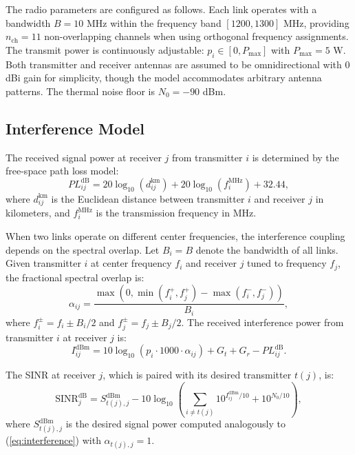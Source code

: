 \documentclass[conference]{IEEEtran}
\begin{document}
The radio parameters are configured as follows. Each link operates with a bandwidth $B = 10$ MHz within the frequency band $[1200, 1300]$ MHz, providing $n_{\text{ch}} = 11$ non-overlapping channels when using orthogonal frequency assignments. The transmit power is continuously adjustable: $p_i \in [0, P_{\max}]$ with $P_{\max} = 5$ W. Both transmitter and receiver antennas are assumed to be omnidirectional with 0 dBi gain for simplicity, though the model accommodates arbitrary antenna patterns. The thermal noise floor is $N_0 = -90$ dBm.

\subsection{Interference Model}

The received signal power at receiver $j$ from transmitter $i$ is determined by the free-space path loss model:
\begin{equation}
PL_{ij}^{\text{dB}} = 20\log_{10}(d_{ij}^{\text{km}}) + 20\log_{10}(f_{i}^{\text{MHz}}) + 32.44,
\label{eq:fspl}
\end{equation}
where $d_{ij}^{\text{km}}$ is the Euclidean distance between transmitter $i$ and receiver $j$ in kilometers, and $f_{i}^{\text{MHz}}$ is the transmission frequency in MHz.

When two links operate on different center frequencies, the interference coupling depends on the spectral overlap. Let $B_i = B$ denote the bandwidth of all links. Given transmitter $i$ at center frequency $f_i$ and receiver $j$ tuned to frequency $f_j$, the fractional spectral overlap is:
\begin{equation}
\alpha_{ij} = \frac{\max\left(0, \min(f_i^{+}, f_j^{+}) - \max(f_i^{-}, f_j^{-})\right)}{B_i},
\label{eq:overlap}
\end{equation}
where $f_i^{\pm} = f_i \pm B_i/2$ and $f_j^{\pm} = f_j \pm B_j/2$. The received interference power from transmitter $i$ at receiver $j$ is:
\begin{equation}
I_{ij}^{\text{dBm}} = 10\log_{10}(p_i \cdot 1000 \cdot \alpha_{ij}) + G_t + G_r - PL_{ij}^{\text{dB}}.
\label{eq:interference}
\end{equation}

The SINR at receiver $j$, which is paired with its desired transmitter $t(j)$, is:
\begin{equation}
\text{SINR}_j^{\text{dB}} = S_{t(j),j}^{\text{dBm}} - 10\log_{10}\left( \sum_{i \neq t(j)} 10^{I_{ij}^{\text{dBm}}/10} + 10^{N_0/10} \right),
\label{eq:sinr}
\end{equation}
where $S_{t(j),j}^{\text{dBm}}$ is the desired signal power computed analogously to (\ref{eq:interference}) with $\alpha_{t(j),j} = 1$.
\end{document}
